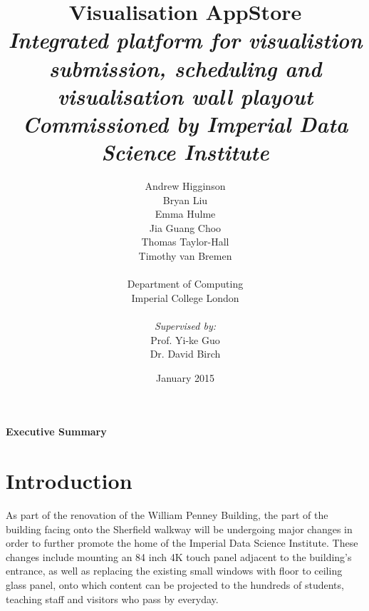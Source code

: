 \documentclass[a4paper, titlepage]{article}
\title{Visualisation AppStore \\ \vspace{10pt}
\textit{\large Integrated platform for visualistion submission, scheduling and visualisation wall playout} \\ \vspace*{-5pt}
\textit{\large Commissioned by Imperial Data Science Institute}}
\author{Andrew Higginson\\ Bryan Liu \\ Emma Hulme \\ Jia Guang Choo \\
        Thomas Taylor-Hall \\ Timothy van Bremen \\\\ 
        Department of Computing \\ Imperial College London \\\\ \textit{Supervised by:} \\
        Prof. Yi-ke Guo \\ Dr. David Birch}
\date{January 2015}
\begin{document}
\maketitle


\newpage
{}
\Large
\textbf{Executive Summary}

\normalsize





\newpage
\tableofcontents
\listoffigures
\listoftables


\newpage
{}
\section{Introduction}
As part of the renovation of the William Penney Building, the part of the building facing onto the Sherfield walkway will be undergoing major changes in order to further promote the home of the Imperial Data Science Institute. These changes include mounting an 84 inch 4K touch panel adjacent to the building's entrance, as well as replacing the existing small windows with floor to ceiling glass panel, onto which content can be projected to the hundreds of students, teaching staff and visitors who pass by everyday.
\end{document}
